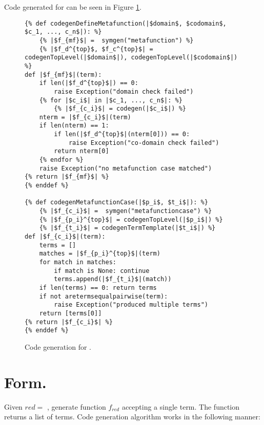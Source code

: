 Code generated for \DefineMetafunctionNoArgs \space can be seen in Figure \ref{codegen-define-metafunc}.
\begin{figure}
\begin{verbatim}
{% def codegenDefineMetafunction(|$domain$, $codomain$, $c_1, ..., c_n$|): %}
	{% |$f_{mf}$| =  symgen("metafunction") %}
	{% |$f_d^{top}$, $f_c^{top}$| = codegenTopLevel(|$domain$|), codegenTopLevel(|$codomain$|) %}
def |$f_{mf}$|(term):
	if len(|$f_d^{top}$|) == 0:
		raise Exception("domain check failed")
	{% for |$c_i$| in |$c_1, ..., c_n$|: %}
		{% |$f_{c_i}$| = codegen(|$c_i$|) %}
	nterm = |$f_{c_i}$|(term)
	if len(nterm) == 1:
		if len(|$f_d^{top}$|(nterm[0])) == 0:
			raise Exception("co-domain check failed")
		return nterm[0]
	{% endfor %}
	raise Exception("no metafunction case matched")
{% return |$f_{mf}$| %}
{% enddef %}

{% def codegenMetafunctionCase(|$p_i$, $t_i$|): %}
	{% |$f_{c_i}$| =  symgen("metafunctioncase") %}
	{% |$f_{p_i}^{top}$| = codegenTopLevel(|$p_i$|) %}
	{% |$f_{t_i}$| = codegenTermTemplate(|$t_i$|) %}
def |$f_{c_i}$|(term):
	terms = []
	matches = |$f_{p_i}^{top}$|(term)
	for match in matches:
		if match is None: continue
		terms.append(|$f_{t_i}$|(match))
	if len(terms) == 0: return terms
	if not aretermsequalpairwise(term):
		raise Exception("produced multiple terms")
	return [terms[0]]
{% return |$f_{c_i}$| %}
{% enddef %}
\end{verbatim}
\caption{Code generation for \DefineMetafunctionNoArgs.}
\label{codegen-define-metafunc}
\end{figure}

\section{\DefineReductionRelationNoArgs \space Form.}
Given $red=$ \TlDefineReductionRelation, generate function $f_{red}$ accepting a single term. The function returns a list of terms. Code generation algorithm works in the following manner:

